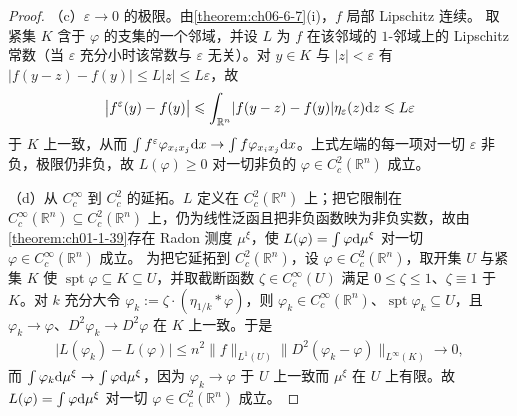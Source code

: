 \documentclass[../../main.tex]{subfiles}%
\begin{document}
\begin{proof}
（c）$\varepsilon\to0$ 的极限。由\cref{theorem:ch06-6-7}(i)，$f$ 局部 Lipschitz 连续。%
取紧集 $K$ 含于 $\varphi$ 的支集的一个邻域，并设 $L$ 为 $f$ 在该邻域的 $1$-邻域上的 Lipschitz 常数（当 $\varepsilon$ 充分小时该常数与 $\varepsilon$ 无关）。对 $y\in K$ 与 $\lvert z\rvert<\varepsilon$ 有 $\lvert f(y-z)-f(y)\rvert\leqslant L\lvert z\rvert\leqslant L\varepsilon$，故
\begin{align*}
\bigl\lvert f^{\varepsilon}(y)-f(y)\bigr\rvert\leqslant\int_{\mathbb{R}^n}\lvert f(y-z)-f(y)\rvert\eta_{\varepsilon}(z)\mathrm{d} z\leqslant L\varepsilon
\end{align*}
于 $K$ 上一致，从而 $\int f^{\varepsilon}\varphi_{x_ix_j}\mathrm{d} x\to\int f\varphi_{x_ix_j}\mathrm{d} x$。上式左端的每一项对一切 $\varepsilon$ 非负，极限仍非负，故 $L(\varphi)\geqslant0$ 对一切非负的 $\varphi\in C_c^{2}(\mathbb{R}^n)$ 成立。%

（d）从 $C_c^{\infty}$ 到 $C_c^{2}$ 的延拓。$L$ 定义在 $C_c^{2}(\mathbb{R}^n)$ 上；把它限制在 $C_c^{\infty}(\mathbb{R}^n)\subseteq C_c^{2}(\mathbb{R}^n)$ 上，仍为线性泛函且把非负函数映为非负实数，故由\cref{theorem:ch01-1-39}存在 Radon 测度 $\mu^{\xi}$，使 $L(\varphi)=\int\varphi\mathrm{d}\mu^{\xi}$ 对一切 $\varphi\in C_c^{\infty}(\mathbb{R}^n)$ 成立。%
为把它延拓到 $C_c^{2}(\mathbb{R}^n)$，设 $\varphi\in C_c^{2}(\mathbb{R}^n)$，取开集 $U$ 与紧集 $K$ 使 $\operatorname{spt}\varphi\subseteq K\subseteq U$，并取截断函数 $\zeta\in C_c^{\infty}(U)$ 满足 $0\leqslant\zeta\leqslant1$、$\zeta\equiv1$ 于 $K$。对 $k$ 充分大令 $\varphi_k:=\zeta\cdot(\eta_{1/k}*\varphi)$，则 $\varphi_k\in C_c^{\infty}(\mathbb{R}^n)$、$\operatorname{spt}\varphi_k\subseteq U$，且 $\varphi_k\to\varphi$、$D^{2}\varphi_k\to D^{2}\varphi$ 在 $K$ 上一致。于是
\begin{align*}
\bigl\lvert L(\varphi_k)-L(\varphi)\bigr\rvert\leqslant n^{2}\lVert f\rVert_{L^{1}(U)}\bigl\lVert D^{2}(\varphi_k-\varphi)\bigr\rVert_{L^{\infty}(K)}\longrightarrow0,
\end{align*}
而 $\int\varphi_k\mathrm{d}\mu^{\xi}\to\int\varphi\mathrm{d}\mu^{\xi}$，因为 $\varphi_k\to\varphi$ 于 $U$ 上一致而 $\mu^{\xi}$ 在 $U$ 上有限。故 $L(\varphi)=\int\varphi\mathrm{d}\mu^{\xi}$ 对一切 $\varphi\in C_c^{2}(\mathbb{R}^n)$ 成立。%


\end{proof}
\end{document}
